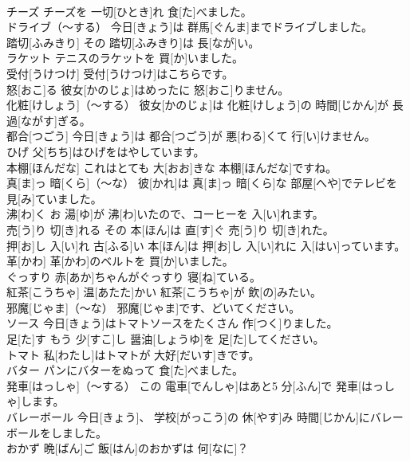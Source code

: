 \documentclass[8pt]{extreport}
\begin{document}
\begin{CJK}{UTF8}{min}
\\	チーズ	チーズを 一切[ひとき]れ 食[た]べました。		
\\	ドライブ（～する）	今日[きょう]は 群馬[ぐんま]までドライブしました。		
\\	踏切[ふみきり]	その 踏切[ふみきり]は 長[なが]い。		
\\	ラケット	テニスのラケットを 買[か]いました。		
\\	受付[うけつけ]	受付[うけつけ]はこちらです。		
\\	怒[おこ]る	彼女[かのじょ]はめったに 怒[おこ]りません。		
\\	化粧[けしょう]（～する）	彼女[かのじょ]は 化粧[けしょう]の 時間[じかん]が 長過[ながす]ぎる。		
\\	都合[つごう]	今日[きょう]は 都合[つごう]が 悪[わる]くて 行[い]けません。		
\\	ひげ	父[ちち]はひげをはやしています。		
\\	本棚[ほんだな]	これはとても 大[おお]きな 本棚[ほんだな]ですね。		
\\	真[ま]っ 暗[くら]（～な）	彼[かれ]は 真[ま]っ 暗[くら]な 部屋[へや]でテレビを 見[み]ていました。		
\\	沸[わ]く	お 湯[ゆ]が 沸[わ]いたので、コーヒーを 入[い]れます。		
\\	売[う]り 切[き]れる	その 本[ほん]は 直[す]ぐ 売[う]り 切[き]れた。		
\\	押[お]し 入[い]れ	古[ふる]い 本[ほん]は 押[お]し 入[い]れに 入[はい]っています。		
\\	革[かわ]	革[かわ]のベルトを 買[か]いました。		
\\	ぐっすり	赤[あか]ちゃんがぐっすり 寝[ね]ている。		
\\	紅茶[こうちゃ]	温[あたた]かい 紅茶[こうちゃ]が 飲[の]みたい。		
\\	邪魔[じゃま]（～な）	邪魔[じゃま]です、どいてください。		
\\	ソース	今日[きょう]はトマトソースをたくさん 作[つく]りました。		
\\	足[た]す	もう 少[すこ]し 醤油[しょうゆ]を 足[た]してください。		
\\	トマト	私[わたし]はトマトが 大好[だいす]きです。		
\\	バター	パンにバターをぬって 食[た]べました。		
\\	発車[はっしゃ]（～する）	この 電車[でんしゃ]はあと5 分[ふん]で 発車[はっしゃ]します。		
\\	バレーボール	今日[きょう]、 学校[がっこう]の 休[やす]み 時間[じかん]にバレーボールをしました。		
\\	おかず	晩[ばん]ご 飯[はん]のおかずは 何[なに]？		

\end{CJK}
\end{document}
